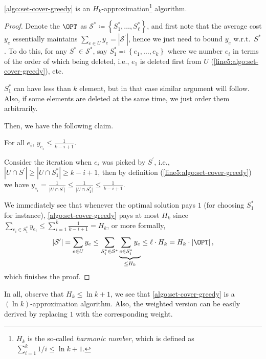 \begin{theorem}\label{thm:set-cover-k-approx}
	\autoref{algo:set-cover-greedy} is an \(H_k\)-approximation\footnote{\(H_k\) is the so-called \emph{harmonic number}, which is defined as \(\sum_{i=1}^{k} 1 / i \leq \ln k + 1\).} algorithm.
\end{theorem}
\begin{proof}
	Denote the \(\OPT\) as \(\mathcal{S} ^{\ast} \coloneqq \left\{ S_1^{\ast} , \dots , S_{\ell}^{\ast} \right\}\), and first note that the average cost \(y_e\) essentially maintains \(\sum_{e\in U} y_e = \left\vert \mathcal{S} ^\prime  \right\vert\), hence we just need to bound \(y_e\) w.r.t.\ \(S^{\ast}\). To do this, for any \(S^{\ast} \in \mathcal{S} ^{\ast} \), say \(S_1^{\ast} \eqqcolon \left\{ e_1, \dots , e_k  \right\} \) where we number \(e_i\) in terms of the order of which being deleted, i.e., \(e_1\) is deleted first from \(U\) (\autoref{line5:algo:set-cover-greedy}), etc.

	\begin{note}
		\(S_1^{\ast} \) can have less than \(k\) element, but in that case similar argument will follow. Also, if some elements are deleted at the same time, we just order them arbitrarily.
	\end{note}

	Then, we have the following claim.

	\begin{claim}\label{clm:set-cover-cost}
		For all \(e_i\), \(y_{e_i} \leq  \frac{1}{k - i + 1}\).
	\end{claim}
	\begin{explanation}
		Consider the iteration when \(e_i\) was picked by \(S^\prime\), i.e., \(\left\vert U \cap S^\prime  \right\vert \geq \left\vert U \cap S_1 ^{\ast} \right\vert \geq k - i + 1\), then by definition (\autoref{line5:algo:set-cover-greedy}) we have \(y_{e_i} = \frac{1}{\vert U \cap S^\prime  \vert } \leq \frac{1}{\vert U \cap  S_1 ^{\ast} \vert} \leq \frac{1}{k - i + 1}\).
	\end{explanation}

	We immediately see that whenever the optimal solution pays \(1\) (for choosing \(S_1^{\ast}\) for instance), \autoref{algo:set-cover-greedy} pays at most \(H_k\) since \(\sum_{e_i\in S_1^{\ast} }y_{e_i} \leq \sum_{i=1}^{k} \frac{1}{k-i+1} = H_k\), or more formally,
	\[
		\left\vert \mathcal{S} ^\prime  \right\vert = \sum_{e\in U}y_e \leq \sum_{S_i^{\ast} \in \mathcal{S} ^{\ast} }\underbrace{\sum_{e\in S_i^{\ast} }y_e}_{\leq H_k} \leq \ell \cdot H_k = H_k\cdot \left\vert \OPT \right\vert,
	\]
	which finishes the proof.
\end{proof}

In all, observe that \(H_k \leq \ln k + 1\), we see that \autoref{algo:set-cover-greedy} is a \((\ln k)\)-approximation algorithm. Also, the weighted version can be easily derived by replacing \(1\) with the corresponding weight.